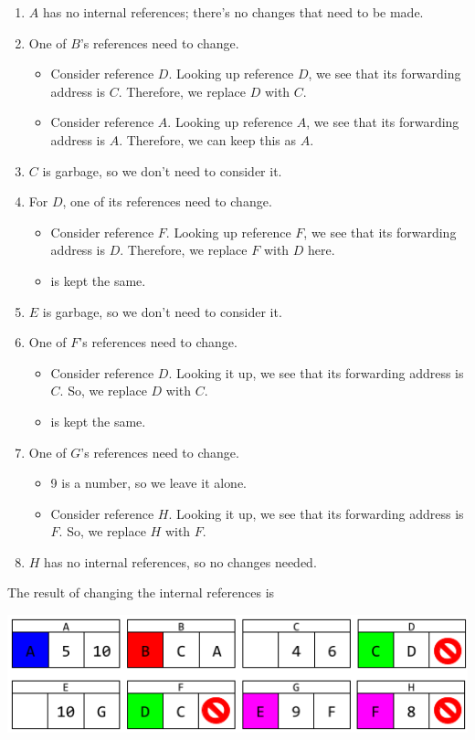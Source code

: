 \documentclass[letterpaper]{article}
\begin{document}
\begin{enumerate}
    \item $A$ has no internal references; there's no changes that need to be made. 
    \item One of $B$'s references need to change. 
    \begin{itemize}
        \item Consider reference $D$. Looking up reference $D$, we see that its forwarding address is $C$. Therefore, we replace $D$ with $C$. 
        \item Consider reference $A$. Looking up reference $A$, we see that its forwarding address is $A$. Therefore, we can keep this as $A$. 
    \end{itemize}
    \item $C$ is garbage, so we don't need to consider it. 
    \item For $D$, one of its references need to change. 
    \begin{itemize}
        \item Consider reference $F$. Looking up reference $F$, we see that its forwarding address is $D$. Therefore, we replace $F$ with $D$ here. 
        \item {} is kept the same. 
    \end{itemize}
    \item $E$ is garbage, so we don't need to consider it. 
    \item One of $F$'s references need to change. 
    \begin{itemize}
        \item Consider reference $D$. Looking it up, we see that its forwarding address is $C$. So, we replace $D$ with $C$.
        \item {} is kept the same.
    \end{itemize}
    \item One of $G$'s references need to change. 
    \begin{itemize}
        \item 9 is a number, so we leave it alone. 
        \item Consider reference $H$. Looking it up, we see that its forwarding address is $F$. So, we replace $H$ with $F$. 
    \end{itemize}
    \item $H$ has no internal references, so no changes needed.
\end{enumerate}
The result of changing the internal references is 
\begin{center}
    \includegraphics[scale=0.5]{../assets/GCAlg4_1.png}
\end{center}
\end{document}
